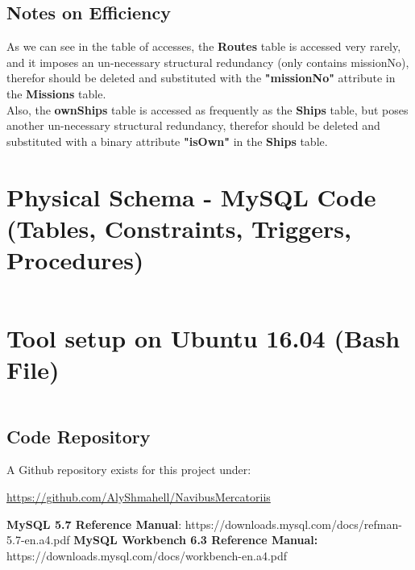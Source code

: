 \documentclass[12pt]{scrartcl}
\begin{document}
\subsection*{Notes on Efficiency}
As we can see in the table of accesses, the \textbf{Routes} table is accessed very rarely, and it imposes an un-necessary structural redundancy (only contains missionNo), therefor should be deleted and substituted with the \textbf{"missionNo"} attribute in the \textbf{Missions} table.\\

Also, the \textbf{ownShips} table is accessed as frequently as the \textbf{Ships} table, but poses another un-necessary structural redundancy, therefor should be deleted and substituted with a binary attribute \textbf{"isOwn"} in the \textbf{Ships} table.
\newpage
\section*{Physical Schema - MySQL Code (Tables, Constraints, Triggers, Procedures)}
\inputminted[breaklines=true, fontsize=\footnotesize]{mysql}{../src/NavibusMercatoriis.sql}
\newpage
\section*{Tool setup on Ubuntu 16.04 (Bash File)}
\inputminted[breaklines=true, fontsize=\footnotesize]{bash}{../src/prerequisites.sh}
\newpage
\begin{flushleft}
	\section*{\textbf{Code Repository}}
\end{flushleft}
\begin{flushleft}
	A Github repository exists for this project under:\\
\end{flushleft}
	\begin{center}
		\url{https://github.com/AlyShmahell/NavibusMercatoriis}
	\end{center}
\begin{thebibliography}{}
		\textbf{MySQL 5.7 Reference Manual}: https://downloads.mysql.com/docs/refman-5.7-en.a4.pdf
		\textbf{MySQL Workbench 6.3 Reference Manual:} https://downloads.mysql.com/docs/workbench-en.a4.pdf
\end{thebibliography}
\end{document}
